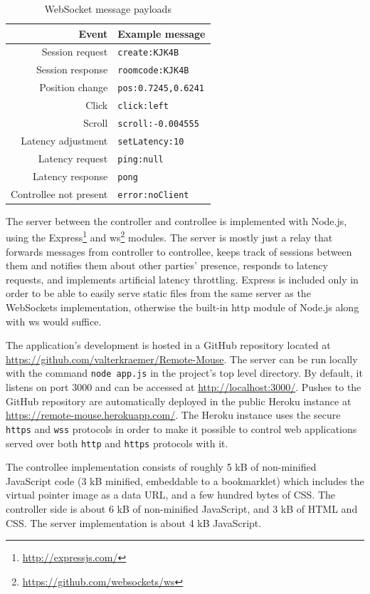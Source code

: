 \documentclass[a4paper,english,twocolumn,9pt]{extarticle}
\begin{document}
\begin{table} \centering
  \begin{tabular}{rl}
    Event & Example message \\
    \hline
    Session request & \verb!create:KJK4B! \\
    Session response & \verb!roomcode:KJK4B! \\
    Position change & \verb!pos:0.7245,0.6241! \\
    Click & \verb!click:left! \\
    Scroll & \verb!scroll:-0.004555! \\
    Latency adjustment & \verb!setLatency:10! \\
    Latency request & \verb!ping:null! \\
    Latency response & \verb!pong! \\
    Controllee not present & \verb!error:noClient! \\
    \hline
  \end{tabular}
  \caption{WebSocket message payloads}
  \label{table:messages}
\end{table}

The server between the controller and controllee is implemented with
Node.js, using the Express\footnote{\url{http://expressjs.com/}} and
ws\footnote{\url{https://github.com/websockets/ws}} modules. The
server is mostly just a relay that forwards messages from controller
to controllee, keeps track of sessions between them and notifies them
about other parties' presence, responds to latency requests, and
implements artificial latency throttling. Express is included only in
order to be able to easily serve static files from the same server as
the WebSockets implementation, otherwise the built-in http module of
Node.js along with ws would suffice.

The application's development is hosted in a GitHub repository located
at \url{https://github.com/valterkraemer/Remote-Mouse}. The server can
be run locally with the command \verb!node app.js! in the project's
top level directory. By default, it listens on port 3000 and can be
accessed at \url{http://localhost:3000/}. Pushes to the GitHub
repository are automatically deployed in the public Heroku instance at
\url{https://remote-mouse.herokuapp.com/}. The Heroku instance uses
the secure \verb!https! and \verb!wss! protocols in order to make it
possible to control web applications served over both \verb!http! and
\verb!https! protocols with it.

The controllee implementation consists of roughly 5 kB of non-minified
JavaScript code (3 kB minified, embeddable to a bookmarklet) which
includes the virtual pointer image as a data URL, and a few hundred
bytes of CSS. The controller side is about 6 kB of non-minified
JavaScript, and 3 kB of HTML and CSS. The server implementation is
about 4 kB JavaScript.
\end{document}

